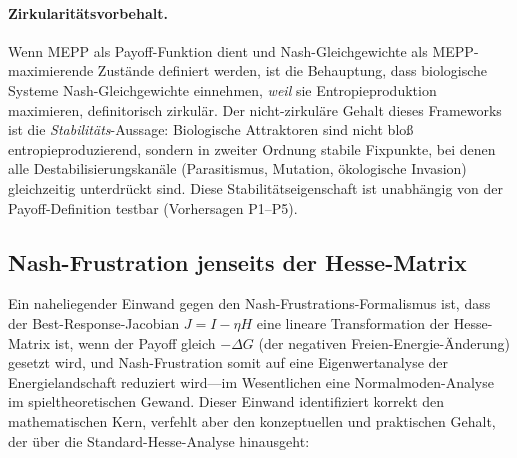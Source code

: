 \documentclass[12pt,a4paper]{article}
\theoremstyle{remark}
\begin{document}
\paragraph{Zirkularit\"atsvorbehalt.} Wenn MEPP als Payoff-Funktion dient und Nash-Gleichgewichte als MEPP-maximierende Zust\"ande definiert werden, ist die Behauptung, dass biologische Systeme Nash-Gleichgewichte einnehmen, \emph{weil} sie Entropieproduktion maximieren, definitorisch zirkul\"ar. Der nicht-zirkul\"are Gehalt dieses Frameworks ist die \emph{Stabilit\"ats}-Aussage: Biologische Attraktoren sind nicht blo\ss{} entropieproduzierend, sondern in zweiter Ordnung stabile Fixpunkte, bei denen alle Destabilisierungskan\"ale (Parasitismus, Mutation, \"okologische Invasion) gleichzeitig unterdr\"uckt sind. Diese Stabilit\"atseigenschaft ist unabh\"angig von der Payoff-Definition testbar (Vorhersagen P1--P5).

\subsection{Nash-Frustration jenseits der Hesse-Matrix}

Ein naheliegender Einwand gegen den Nash-Frustrations-Formalismus ist, dass der Best-Response-Jacobian $J = I - \eta H$ eine lineare Transformation der Hesse-Matrix ist, wenn der Payoff gleich $-\Delta G$ (der negativen Freien-Energie-\"Anderung) gesetzt wird, und Nash-Frustration somit auf eine Eigenwertanalyse der Energielandschaft reduziert wird---im Wesentlichen eine Normalmoden-Analyse im spieltheoretischen Gewand. Dieser Einwand identifiziert korrekt den mathematischen Kern, verfehlt aber den konzeptuellen und praktischen Gehalt, der \"uber die Standard-Hesse-Analyse hinausgeht:
\end{document}
